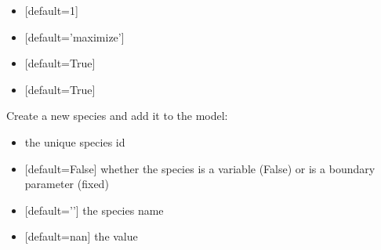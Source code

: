 \documentclass[letterpaper,12pt,english]{sphinxmanual}
\begin{document}
\begin{fulllineitems}
\begin{fulllineitems}
\begin{itemize}
\item {} 
\sphinxAtStartPar
{} {[}default=1{]}

\item {} 
\sphinxAtStartPar
{} {[}default=’maximize’{]}

\item {} 
\sphinxAtStartPar
{} {[}default=True{]}

\item {} 
\sphinxAtStartPar
{} {[}default=True{]}

\end{itemize}

\end{fulllineitems}


\begin{fulllineitems}
\label{\detokenize{api/core:cbmpy.CBModel.Model.createSpecies}}
\pysigstartsignatures
\pysiglinewithargsret
{}
{\sphinxparamcomma {}\sphinxparamcomma {}\sphinxparamcomma {}\sphinxparamcomma {}\sphinxparamcomma {}\sphinxparamcomma {}}
{}
\pysigstopsignatures
\sphinxAtStartPar
Create a new species and add it to the model:
\begin{itemize}
\item {} 
\sphinxAtStartPar
{} the unique species id

\item {} 
\sphinxAtStartPar
{} {[}default=False{]} whether the species is a variable (False) or is a boundary parameter (fixed)

\item {} 
\sphinxAtStartPar
{} {[}default=’’{]} the species name

\item {} 
\sphinxAtStartPar
{} {[}default=nan{]} the value 


\end{itemize}
\end{fulllineitems}
\end{fulllineitems}
\end{document}
